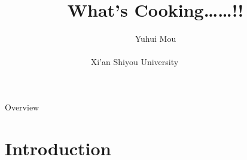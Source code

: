\documentclass[
 size=14pt,
 paper=smartboard,  %
 mode=present, 		%
 display=slides, 	%
 style=tuliplab,  	%
 pauseslide,
 fleqn,leqno]{powerdot}
\title{What's Cooking……!!} %
\author{
Yuhui Mou
\\
\\Xi'an Shiyou University~~~~~~~~~~
} %
\newcommand\twotonebox[2]{\fcolorbox{pdcolor2}{pdcolor2}
{#1\vphantom{#2}}\fcolorbox{pdcolor2}{white}{#2\vphantom{#1}}}
\begin{document}
\maketitle



\begin{slide}[toc=,bm=]{Overview}  %
\tableofcontents
\end{slide}


\section{Introduction} %



\end{document}
